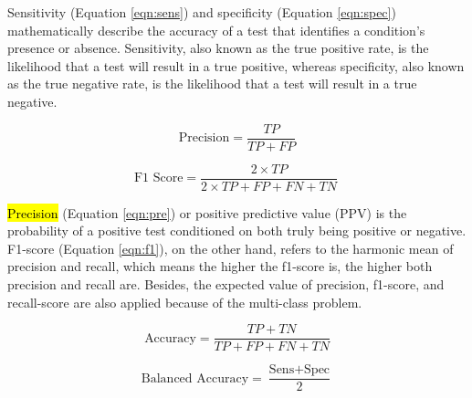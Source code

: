 \documentclass[sensors,article,accept,pdftex,moreauthors]{Definitions/mdpi}
\begin{document}
	{{Sensitivity (Equation \mbox{\eqref{eqn:sens}}) and specificity (Equation \mbox{\eqref{eqn:spec}}) mathematically describe the accuracy of a test that identifies a condition's presence or absence. Sensitivity, also known as the true positive rate, is the likelihood that a test will result in a true positive, whereas specificity, also known as the true negative rate, is the likelihood that a test will result in a true negative.}}
	
	\begin{equation}
		\label{eqn:pre}
		\text{Precision} = \frac{TP}{TP + FP}
	\end{equation}
	
	\begin{equation}
		\label{eqn:f1}
		\text{F1 Score} = \frac{2 \times TP}{2 \times TP + FP + FN + TN}\
	\end{equation}
	
	\hl{Precision} %
 (Equation \eqref{eqn:pre}) or positive predictive value (PPV) is the probability of a positive test conditioned on both truly being positive or negative. F1-score (Equation \eqref{eqn:f1}), on the other hand, refers to the harmonic mean of precision and recall, which means the higher the f1-score is, the higher both precision and recall are. Besides, the expected value of precision, f1-score, and recall-score are also applied because of the multi-class problem.
	
	\begin{equation}
		\label{eqn:acc}
		\text{Accuracy} = \frac{TP + TN}{TP + FP + FN + TN}
	\end{equation}
	
	\begin{equation}
		\label{eqn:balacc}
		\text{Balanced Accuracy} = \frac{\text{Sens} + \text{Spec}}{2}
	\end{equation}
	
\end{document}
